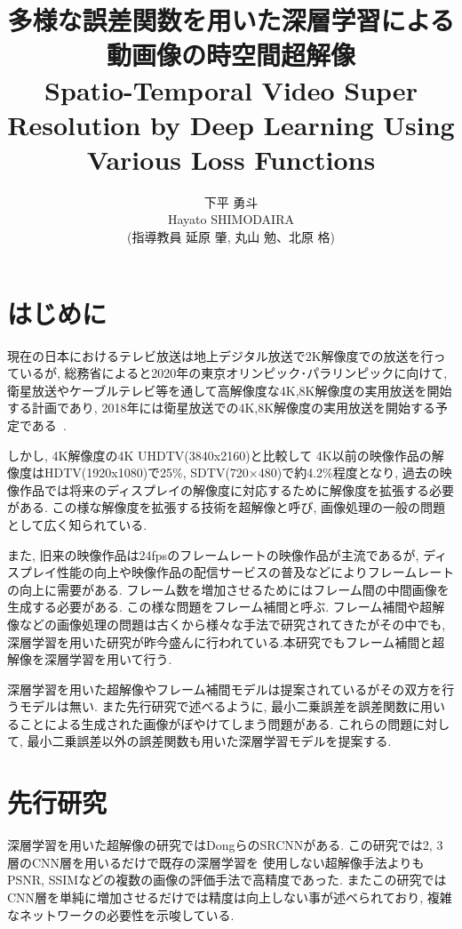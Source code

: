 \documentclass[twocolumn,a4j,uplatex]{jsarticle}
\title{{\Large 多様な誤差関数を用いた深層学習による動画像の時空間超解像} \\
Spatio-Temporal Video Super Resolution by Deep Learning Using Various Loss Functions}
\author{{\Large 下平 勇斗} \\ Hayato SHIMODAIRA \\ (指導教員 延原 肇, 丸山 勉、北原 格)}
\begin{document}
\maketitle
\thispagestyle{headings}
\section{はじめに}
現在の日本におけるテレビ放送は地上デジタル放送で2K解像度での放送を行っているが,
総務省によると2020年の東京オリンピック･パラリンピックに向けて,
衛星放送やケーブルテレビ等を通して高解像度な4K,8K解像度の実用放送を開始する計画であり,
2018年には衛星放送での4K,8K解像度の実用放送を開始する予定である~\cite{soumu}.

しかし, 4K解像度の4K UHDTV(3840x2160)と比較して
4K以前の映像作品の解像度はHDTV(1920x1080)で25\%, SDTV(720×480)で約4.2\%程度となり,
過去の映像作品では将来のディスプレイの解像度に対応するために解像度を拡張する必要がある.
この様な解像度を拡張する技術を超解像と呼び, 画像処理の一般の問題として広く知られている.

また, 旧来の映像作品は24fpsのフレームレートの映像作品が主流であるが,
ディスプレイ性能の向上や映像作品の配信サービスの普及などによりフレームレートの向上に需要がある.
フレーム数を増加させるためにはフレーム間の中間画像を生成する必要がある.
この様な問題をフレーム補間と呼ぶ.
フレーム補間や超解像などの画像処理の問題は古くから様々な手法で研究されてきたがその中でも,
深層学習を用いた研究が昨今盛んに行われている.本研究でもフレーム補間と超解像を深層学習を用いて行う.

深層学習を用いた超解像やフレーム補間モデルは提案されているがその双方を行うモデルは無い.
また先行研究で述べるように, 最小二乗誤差を誤差関数に用いることによる生成された画像がぼやけてしまう問題がある.
これらの問題に対して, 最小二乗誤差以外の誤差関数も用いた深層学習モデルを提案する.

\section{先行研究}
深層学習を用いた超解像の研究ではDongらのSRCNN\cite{Dong2015}がある.
この研究では2, 3層のCNN層を用いるだけで既存の深層学習を
使用しない超解像手法よりもPSNR, SSIMなどの複数の画像の評価手法で高精度であった.
またこの研究ではCNN層を単純に増加させるだけでは精度は向上しない事が述べられており,
複雑なネットワークの必要性を示唆している.
\end{document}

